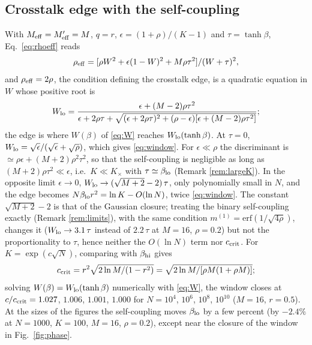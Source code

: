 \documentclass{SciPost}
\theoremstyle{plain}
\theoremstyle{definition}
\newcommand{\Meff}{M_{\rm eff}}
\newcommand{\erf}{\mathrm{erf}}
\begin{document}
\begin{appendix}
\section{Crosstalk edge with the self-coupling}
With $\Meff=\Meff'=M$, $q=r$, $\epsilon=(1+\rho)/(K-1)$ and $\tau=\tanh\beta$, Eq.\ \eqref{eq:rhoeff} reads
\begin{equation*}
\rho_{\rm eff}=[\rho W^2+\epsilon(1-W)^2+M\rho\tau^2]/(W+\tau)^2,
\end{equation*}
and $\rho_{\rm eff}=2\rho$, the condition defining the crosstalk edge, is a quadratic equation in $W$ whose positive root is
\begin{equation*}
W_{\rm lo}=\frac{\epsilon+(M-2)\rho\tau^2}{\epsilon+2\rho\tau+\sqrt{(\epsilon+2\rho\tau)^2+(\rho-\epsilon)[\epsilon+(M-2)\rho\tau^2]}};
\end{equation*}
the edge is where $W(\beta)$ of \eqref{eq:W} reaches $W_{\rm lo}(\tanh\beta)$. At $\tau=0$, $W_{\rm lo}=\sqrt\epsilon/(\sqrt\epsilon+\sqrt\rho)$, which gives \eqref{eq:window}. For $\epsilon\ll\rho$ the discriminant is $\simeq\rho\epsilon+(M+2)\rho^2\tau^2$, so that the self-coupling is negligible as long as $(M+2)\rho\tau^2\ll\epsilon$, i.e.\ $K\ll K_\times$ with $\tau\simeq\beta_{\rm lo}$ (Remark \ref{rem:largeK}). In the opposite limit $\epsilon\to0$, $W_{\rm lo}\to(\sqrt{M+2}-2)\,\tau$, only polynomially small in $N$, and the edge becomes $N\beta_{\rm lo}r^2=\ln K-O(\ln N)$, twice \eqref{eq:window}. The constant $\sqrt{M+2}-2$ is that of the Gaussian closure; treating the binary self-coupling exactly (Remark \ref{rem:limits}), with the same condition $m^{(1)}=\erf(1/\sqrt{4\rho})$, changes it ($W_{\rm lo}\to3.1\,\tau$ instead of $2.2\,\tau$ at $M=16$, $\rho=0.2$) but not the proportionality to $\tau$, hence neither the $O(\ln N)$ term nor $c_{\rm crit}$. For $K=\exp(c\sqrt N)$, comparing with $\beta_{\rm hi}$ gives
\begin{equation*}
c_{\rm crit}=r^2\sqrt{2\ln M/(1-r^2)}=\sqrt{2\ln M/[\rho M(1+\rho M)]};
\end{equation*}
solving $W(\beta)=W_{\rm lo}(\tanh\beta)$ numerically with \eqref{eq:W}, the window closes at $c/c_{\rm crit}=1.027$, $1.006$, $1.001$, $1.000$ for $N=10^4$, $10^6$, $10^8$, $10^{10}$ ($M=16$, $r=0.5$). At the sizes of the figures the self-coupling moves $\beta_{\rm lo}$ by a few percent (by $-2.4\%$ at $N=1000$, $K=100$, $M=16$, $\rho=0.2$), except near the closure of the window in Fig.\ \ref{fig:phase}.

\end{appendix}


\end{document}
